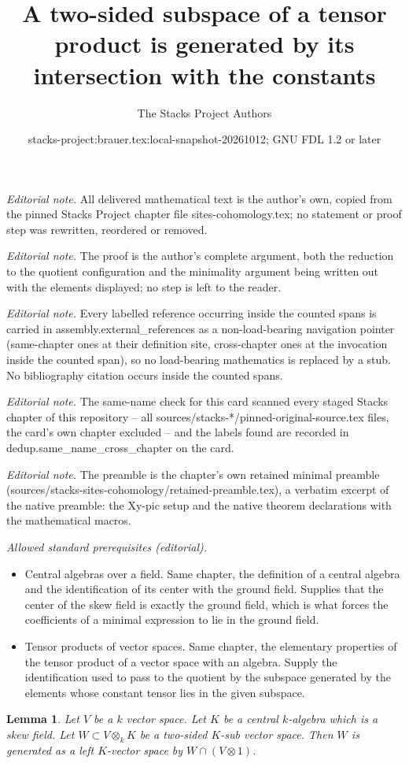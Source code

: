 \documentclass[10pt,a4paper]{amsart}
\title{A two-sided subspace of a tensor product is generated by its intersection with the constants}
\author{The Stacks Project Authors}
\date{stacks-project:brauer.tex:local-snapshot-20261012; GNU FDL 1.2 or later}
\theoremstyle{plain}
\newtheorem{lemma}[subsection]{Lemma}
\theoremstyle{definition}
\theoremstyle{remark}
\numberwithin{equation}{subsection}
\begin{document}
\maketitle
\noindent\textit{Editorial note.} All delivered mathematical text is the author's own, copied from the pinned Stacks Project chapter file sites-cohomology.tex; no statement or proof step was rewritten, reordered or removed.\par\medskip
\noindent\textit{Editorial note.} The proof is the author's complete argument, both the reduction to the quotient configuration and the minimality argument being written out with the elements displayed; no step is left to the reader.\par\medskip
\noindent\textit{Editorial note.} Every labelled reference occurring inside the counted spans is carried in assembly.external\_references as a non-load-bearing navigation pointer (same-chapter ones at their definition site, cross-chapter ones at the invocation inside the counted span), so no load-bearing mathematics is replaced by a stub. No bibliography citation occurs inside the counted spans.\par\medskip
\noindent\textit{Editorial note.} The same-name check for this card scanned every staged Stacks chapter of this repository -- all sources/stacks-*/pinned-original-source.tex files, the card's own chapter excluded -- and the labels found are recorded in dedup.same\_name\_cross\_chapter on the card.\par\medskip
\noindent\textit{Editorial note.} The preamble is the chapter's own retained minimal preamble (sources/stacks-sites-cohomology/retained-preamble.tex), a verbatim excerpt of the native preamble: the Xy-pic setup and the native theorem declarations with the mathematical macros.\par\medskip
\noindent\textit{Allowed standard prerequisites (editorial).}\begin{itemize}
\item Central algebras over a field. Same chapter, the definition of a central algebra and the identification of its center with the ground field. Supplies that the center of the skew field is exactly the ground field, which is what forces the coefficients of a minimal expression to lie in the ground field.
\item Tensor products of vector spaces. Same chapter, the elementary properties of the tensor product of a vector space with an algebra. Supply the identification used to pass to the quotient by the subspace generated by the elements whose constant tensor lies in the given subspace.
\end{itemize}\medskip
\begin{lemma}
\label{lemma-generate-two-sided-sub}
Let $V$ be a $k$ vector space. Let $K$ be a central $k$-algebra
which is a skew field. Let $W \subset V \otimes_k K$ be a two-sided
$K$-sub vector space. Then $W$ is generated as a left $K$-vector
space by $W \cap (V \otimes 1)$.
\end{lemma}
\end{document}
